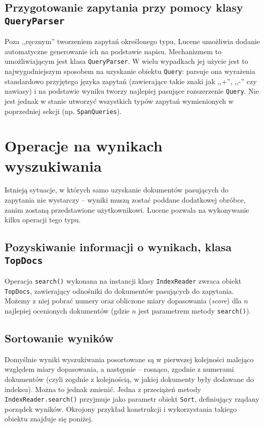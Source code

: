 \subsection{Przygotowanie zapytania przy pomocy klasy \texttt{QueryParser}}

Poza ,,ręcznym'' tworzeniem zapytań określonego typu, Lucene umożliwia dodanie automatyczne generowanie ich na podstawie napisu. Mechanizmem to umożliwiającym jest klasa \texttt{QueryParser}. W wielu wypadkach jej użycie jest to najwygodniejszym sposobem na uzyskanie obiektu \texttt{Query}: parsuje ona wyrażenia standardowo przyjętego języka zapytań (zawierające takie znaki jak ,,+'', ,,-'' czy nawiasy) i na podstawie wyniku tworzy najlepiej pasujące rozszerzenie \texttt{Query}. Nie jest jednak w stanie utworzyć wszystkich typów zapytań wymienionych w poprzedniej sekcji (np. \texttt{SpanQueries}).

\section{Operacje na wynikach wyszukiwania}

Istnieją sytuacje, w których samo uzyskanie dokumentów pasujących do zapytania nie wystarczy -- wyniki muszą zostać poddane dodatkowej obróbce, zanim zostaną przedstawione użytkownikowi. Lucene pozwala na wykonywanie kilku operacji tego typu.

\subsection{Pozyskiwanie informacji o wynikach, klasa \texttt{TopDocs}}

Operacja \texttt{search()} wykonana na instancji klasy \texttt{IndexReader} zwraca obiekt \texttt{TopDocs}, zawierający odnośniki do dokumentów pasujących do zapytania. Możemy z niej pobrać numery oraz obliczone miary dopasowania (\emph{score}) dla $n$ najlepiej ocenionych dokumentów (gdzie $n$ jest parametrem metody \texttt{search()}).

\subsection{Sortowanie wyników}

Domyślnie wyniki wyszukiwania posortowane są w pierwszej kolejności malejąco względem miary dopasowania, a następnie -- rosnąco, zgodnie z numerami dokumentów (czyli zogdnie z kolejnością, w jakiej dokumenty były dodawane do indeksu). Można to jednak zmienić. Jedna z przeciążeń metody \texttt{IndexReader.search()} przyjmuje jako parametr obiekt \texttt{Sort}, definiujący rządany porządek wyników. Okrojony przykład konstrukcji i wykorzystania takiego obiektu znajduje się poniżej.

